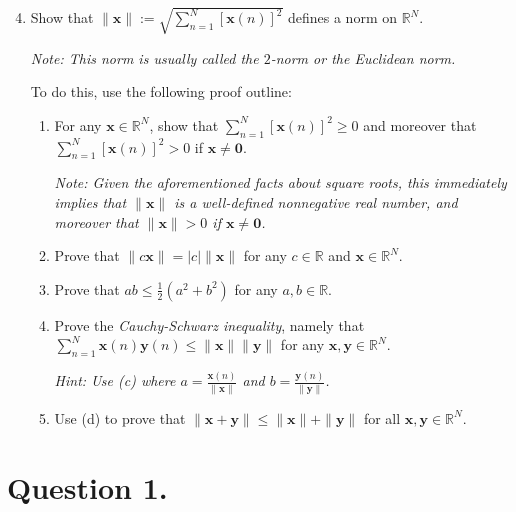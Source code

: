 \documentclass[12 pt,letterpaper]{article}
\newcommand{\bbR}{\mathbb{R}}
\newcommand{\bfx}{\boldsymbol{x}}
\newcommand{\bfy}{\boldsymbol{y}}
\newcommand{\bfzero}{\boldsymbol{0}}
\newcommand{\abs}[1]{|{#1}|}
\newcommand{\norm}[1]{\|{#1}\|}
\begin{document}
\begin{enumerate}
\setcounter{enumi}{3}
\item
Show that $\displaystyle\norm{\bfx}:=\sqrt{\sum_{n=1}^{N}[\bfx(n)]^2}$ defines a norm on $\bbR^N$.

\textit{Note: This norm is usually called the $2$-norm or the Euclidean norm.}

To do this, use the following proof outline:

\begin{enumerate}
\item
For any $\bfx\in\bbR^N$,
show that $\displaystyle\sum_{n=1}^N[\bfx(n)]^2\geq0$ and moreover that
$\displaystyle\sum_{n=1}^N[\bfx(n)]^2>0$ if $\bfx\neq\bfzero$.

\textit{Note: Given the aforementioned facts about square roots,
this immediately implies that $\norm{\bfx}$ is a well-defined nonnegative real number,
and moreover that $\norm{\bfx}>0$ if $\bfx\neq\bfzero$.}

\item
Prove that $\norm{c\bfx}=\abs{c}\norm{\bfx}$ for any $c\in\bbR$ and $\bfx\in\bbR^N$.

\item
Prove that $ab\leq\frac12(a^2+b^2)$ for any $a,b\in\bbR$.

\item
Prove the \textit{Cauchy-Schwarz inequality},
namely that $\displaystyle\sum_{n=1}^{N}\bfx(n)\bfy(n)\leq\norm{\bfx}\norm{\bfy}$ for any $\bfx,\bfy\in\bbR^N$.

\textit{Hint: Use (c) where $\displaystyle a=\frac{\bfx(n)}{\norm{\bfx}}$ and $\displaystyle b=\frac{\bfy(n)}{\norm{\bfy}}$.}

\item
Use (d) to prove that $\norm{\bfx+\bfy}\leq\norm{\bfx}+\norm{\bfy}$ for all $\bfx,\bfy\in\bbR^N$.
\end{enumerate}
\end{enumerate}


\clearpage
\section*{Question 1.}
\end{document}
